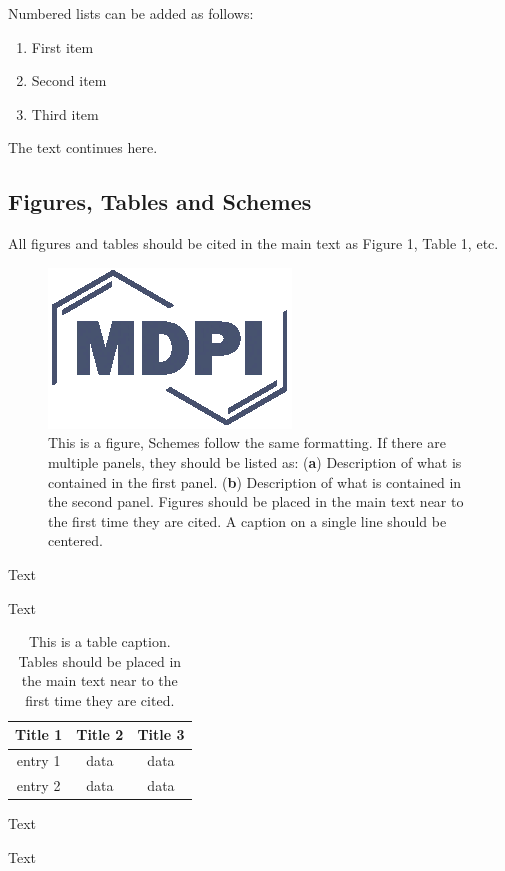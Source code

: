 \documentclass[materials,article,submit,moreauthors,pdftex]{Definitions/mdpi}
\begin{document}
Numbered lists can be added as follows:
\begin{enumerate}[leftmargin=*,labelsep=4.9mm]
\item	First item 
\item	Second item
\item	Third item
\end{enumerate}

The text continues here.

\subsection{Figures, Tables and Schemes}

All figures and tables should be cited in the main text as Figure 1, Table 1, etc.

\begin{figure}[H]
\centering
\includegraphics[width=2 cm]{Definitions/logo-mdpi}
\caption{This is a figure, Schemes follow the same formatting. If there are multiple panels, they should be listed as: (\textbf{a}) Description of what is contained in the first panel. (\textbf{b}) Description of what is contained in the second panel. Figures should be placed in the main text near to the first time they are cited. A caption on a single line should be centered.}
\end{figure}   
 
Text

Text

\begin{table}[H]
\caption{This is a table caption. Tables should be placed in the main text near to the first time they are cited.}
\centering
\begin{tabular}{ccc}
\toprule
\textbf{Title 1}	& \textbf{Title 2}	& \textbf{Title 3}\\
\midrule
entry 1		& data			& data\\
entry 2		& data			& data\\
\bottomrule
\end{tabular}
\end{table}

Text

Text

\end{document}
